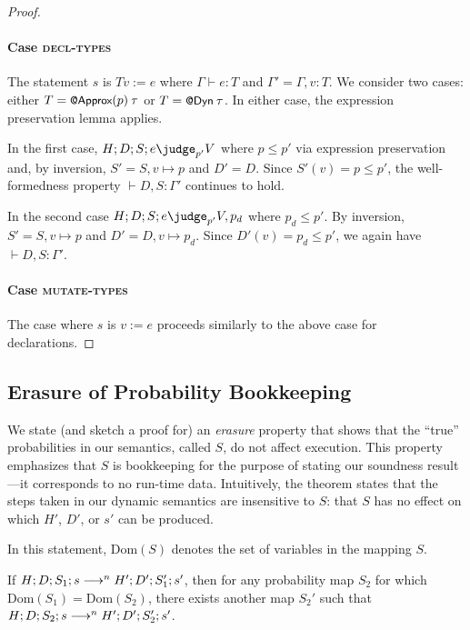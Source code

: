 {\begin{proof}
\paragraph{Case \textsc{decl-types}}
    The statement $s$ is $T v := e$
    where $\Gamma \vdash e : T$
    and $\Gamma' = \Gamma, v : T$.
    We consider two cases: either $T = \text{\normalfont{\sffamily\small{@Approx}}}(p) \> \tau$
    or $T = \text{\normalfont{\sffamily\small{@Dyn}}} \> \tau$.
    In either case, the expression preservation lemma applies.

    In the first case,
    $H ; D ; S ; e \pjudge{p'} V$ where $p \le p'$ via expression preservation
    and, by inversion,
    $S' = S, v \mapsto p$ and $D' = D$.
    Since $S'(v) = p \le p'$,
    the well-formedness property $\vdash D, S : \Gamma'$ continues to hold.

    In the second case
    $H ; D ; S ; e \pjudge{p'} V, p_d$ where $p_d \le p'$.
    By inversion,
    $S' = S, v \mapsto p$ and $D' = D, v \mapsto p_d$.
    Since $D'(v) = p_d \le p'$,
    we again have $\vdash D, S : \Gamma'$.

\paragraph{Case \textsc{mutate-types}}
    The case where $s$ is $v := e$ proceeds similarly to the above case for
    declarations.
\end{proof}


\subsection{Erasure of Probability Bookkeeping}

We state (and sketch a proof for) an \emph{erasure} property that
shows that the ``true'' probabilities in our semantics, called $S$, do not
affect execution.
This property emphasizes that $S$ is bookkeeping for the purpose of stating
our soundness result---it corresponds to no run-time data.
Intuitively, the theorem states that the steps taken in our dynamic semantics
are insensitive to $S$: that $S$ has no effect on which $H'$, $D'$, or $s'$
can be produced.

In this statement, $\mathrm{Dom}(S)$ denotes the set of variables in the mapping
$S$.

\begin{theorem}
If
$H ; D ; S_1 ; s
\longrightarrow^n
H' ; D' ; S_1' ; s'$,
then for any probability map $S_2$
for which $\mathrm{Dom}(S_1) = \mathrm{Dom}(S_2)$,
there exists another map $S_2'$ such that
$H ; D ; S_2 ; s
\longrightarrow^n
H' ; D' ; S_2' ; s'$.
\end{theorem}

}
